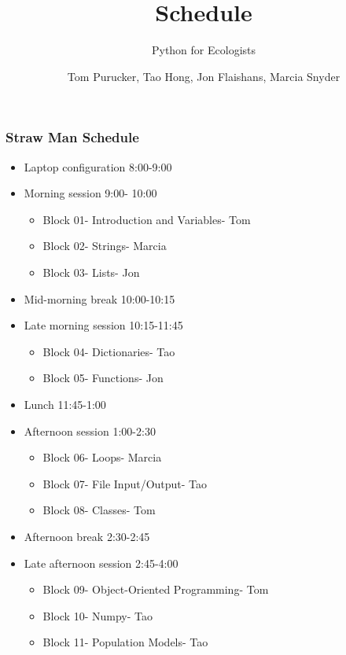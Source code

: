 \documentclass{beamer}
\title[Title1]{Schedule}
\subtitle[Title2]{Python for Ecologists}
\author[etal]{Tom Purucker, Tao Hong, Jon Flaishans, Marcia Snyder}
\institute[EPA]{
  Ecological Society of America Workshop\\
  Minneapolis, MN\\[1ex]
  \texttt{purucker.tom@gmail.com}
}
\newcommand\Fontvi{\fontsize{6}{7.2}\selectfont}
\begin{document}
\begin{frame}[plain]
  \titlepage
\end{frame}




\begin{frame}[fragile]
\frametitle{Straw Man Schedule}
\begin{itemize}
  \item Laptop configuration 8:00-9:00
  \item Morning session 9:00- 10:00
\begin{itemize}
  \item Block 01- Introduction and Variables- Tom
  \item Block 02- Strings- Marcia
  \item Block 03- Lists- Jon
\end{itemize}
  \item Mid-morning break 10:00-10:15
  \item Late morning session 10:15-11:45
\begin{itemize}
  \item Block 04- Dictionaries- Tao
  \item Block 05- Functions- Jon
\end{itemize}
  \item Lunch 11:45-1:00
  \item Afternoon session 1:00-2:30
\begin{itemize}
  \item Block 06- Loops- Marcia
  \item Block 07- File Input/Output- Tao
  \item Block 08- Classes- Tom
\end{itemize}
  \item Afternoon break 2:30-2:45
  \item Late afternoon session 2:45-4:00
\begin{itemize}
  \item Block 09- Object-Oriented Programming- Tom
  \item Block 10- Numpy- Tao
  \item Block 11- Population Models- Tao 
\end{itemize}
\end{itemize} 
\end{frame}
\end{document}
